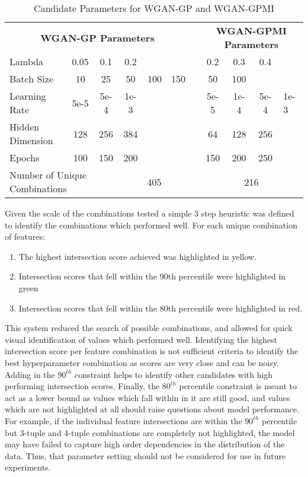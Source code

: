 \begin{table}[!htbp]
	\centering
	\caption{Candidate Parameters for WGAN-GP and WGAN-GPMI}
	\label{tab:param_sweep}
	\begin{tabular}{l|ccccc|l|cccl}
		\cline{1-11}
		\multicolumn{6}{c}{\textbf{WGAN-GP Parameters}} & \multicolumn{1}{l}{} & \multicolumn{4}{c}{\textbf{WGAN-GPMI Parameters}} \\ 
		\cline{1-11} 
		Lambda & 0.05 & 0.1 & 0.2 & & & & 0.2 & 0.3 & 0.4 & \\
		Batch Size & 10 & 25 & 50 & 100 & 150 & & 50 & 100 &  & \\
		Learning Rate & 5e-5 & 5e-4 & 1e-3 & & & & 5e-5 & 1e-4 & 5e-4 & 1e-3 \\
		Hidden Dimension & 128 & 256 & 384 & & & & 64 & 128 & 256 & \\
		Epochs & 100 & 150 & 200 & & & & 150 & 200 & 250 & \\ 
		\cline{1-11}
		\multicolumn{3}{l|}{Number of Unique Combinations} & \multicolumn{3}{c}{405} & \multicolumn{1}{|l|}{} & \multicolumn{4}{c}{216} \\ \cline{1-11}
	\end{tabular}
\end{table}

Given the scale of the combinations tested a simple 3 step heuristic was defined to identify the combinations which performed well. For each unique combination of features:
\begin{enumerate}
	\item The highest intersection score achieved was highlighted in yellow.
	\item Intersection scores that fell within the 90th percentile were highlighted in green
	\item Intersection scores that fell within the 80th percentile were highlighted in red. 
\end{enumerate}

This system reduced the search of possible combinations, and allowed for quick visual identification of values which performed well. Identifying the highest intersection score per feature combination is not sufficient criteria to identify the best hyperparameter combination as scores are very close and can be noisy. Adding in the $90^{th}$ constraint helps to identify other candidates with high performing intersection scores. Finally, the $80^{th}$ percentile constraint is meant to act as a lower bound as values which fall within in it are still good, and values which are not highlighted at all should raise questions about model performance. For example, if the individual feature intersections are within the $90^{th}$ percentile but 3-tuple and 4-tuple combinations are completely not highlighted, the model may have failed to capture high order dependencies in the distribution of the data. Thus, that parameter setting should not be considered for use in future experiments. 

